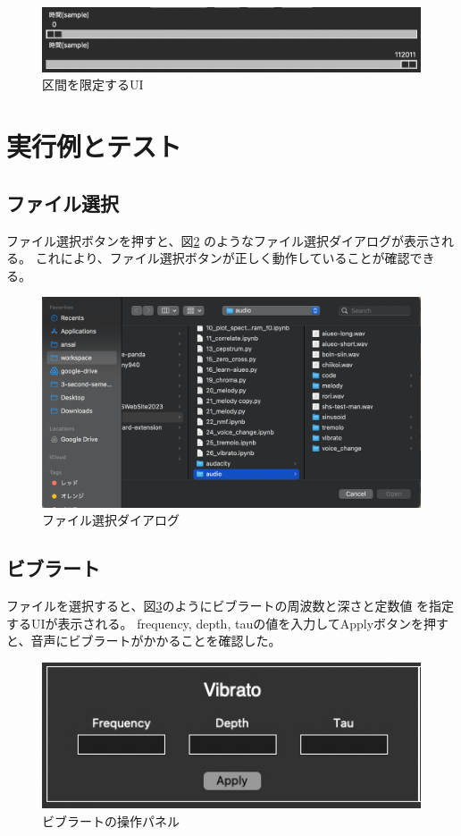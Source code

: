\documentclass[a4paper,11pt]{jsarticle}
\begin{document}
\begin{figure}[h]
\centering
\includegraphics[keepaspectratio, width = 13cm]
{./images/sliders.png}
\caption{区間を限定するUI}
\label{fig:sliders}
\end{figure}

\section{実行例とテスト}
\subsection{ファイル選択}
ファイル選択ボタンを押すと、図\ref{fig:file_select_dialog}
のようなファイル選択ダイアログが表示される。
これにより、ファイル選択ボタンが正しく動作していることが確認できる。

\begin{figure}[h]
\centering
\includegraphics[keepaspectratio, width=13cm]
{./images/file_select_dialog.png}
\caption{ファイル選択ダイアログ}
\label{fig:file_select_dialog}
\end{figure}

\subsection{ビブラート}
ファイルを選択すると、図\ref{fig:vibrato}のようにビブラートの周波数と深さと定数値
を指定するUIが表示される。
frequency, depth, tauの値を入力してApplyボタンを押すと、音声にビブラートがかかることを確認した。

\begin{figure}[h]
\centering
\includegraphics[keepaspectratio, width=13cm]
{./images/vibrato.jpg}
\caption{ビブラートの操作パネル}
\label{fig:vibrato}
\end{figure}
\end{document}
